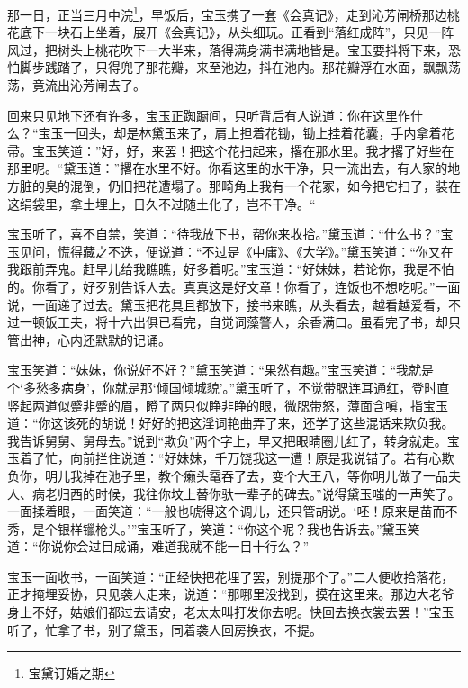 \documentclass[12pt,oneside]{book}
\begin{document}
那一日，正当三月中浣\footnote{宝黛订婚之期}，早饭后，宝玉携了一套《会真记》，走到沁芳闸桥那边桃花底下一块石上坐着，展开《会真记》，从头细玩。正看到“落红成阵”，只见一阵风过，把树头上桃花吹下一大半来，落得满身满书满地皆是。宝玉要抖将下来，恐怕脚步践踏了，只得兜了那花瓣，来至池边，抖在池内。那花瓣浮在水面，飘飘荡荡，竟流出沁芳闸去了。

回来只见地下还有许多，宝玉正踟蹰间，只听背后有人说道：你在这里作什么？“宝玉一回头，却是林黛玉来了，肩上担着花锄，锄上挂着花囊，手内拿着花帚。宝玉笑道：”好，好，来罢！把这个花扫起来，撂在那水里。我才撂了好些在那里呢。“黛玉道：”撂在水里不好。你看这里的水干净，只一流出去，有人家的地方脏的臭的混倒，仍旧把花遭塌了。那畸角上我有一个花冢，如今把它扫了，装在这绢袋里，拿土埋上，日久不过随土化了，岂不干净。“

宝玉听了，喜不自禁，笑道：“待我放下书，帮你来收拾。”黛玉道：“什么书？”宝玉见问，慌得藏之不迭，便说道：“不过是《中庸》、《大学》。”黛玉笑道：“你又在我跟前弄鬼。赶早儿给我瞧瞧，好多着呢。”宝玉道：“好妹妹，若论你，我是不怕的。你看了，好歹别告诉人去。真真这是好文章！你看了，连饭也不想吃呢。”一面说，一面递了过去。黛玉把花具且都放下，接书来瞧，从头看去，越看越爱看，不过一顿饭工夫，将十六出俱已看完，自觉词藻警人，余香满口。虽看完了书，却只管出神，心内还默默的记诵。

宝玉笑道：“妹妹，你说好不好？”黛玉笑道：“果然有趣。”宝玉笑道：“我就是个‘多愁多病身’，你就是那‘倾国倾城貌’。”黛玉听了，不觉带腮连耳通红，登时直竖起两道似蹙非蹙的眉，瞪了两只似睁非睁的眼，微腮带怒，薄面含嗔，指宝玉道：“你这该死的胡说！好好的把这淫词艳曲弄了来，还学了这些混话来欺负我。我告诉舅舅、舅母去。”说到“欺负”两个字上，早又把眼睛圈儿红了，转身就走。宝玉着了忙，向前拦住说道：“好妹妹，千万饶我这一遭！原是我说错了。若有心欺负你，明儿我掉在池子里，教个癞头鼋吞了去，变个大王八，等你明儿做了一品夫人、病老归西的时候，我往你坟上替你驮一辈子的碑去。”说得黛玉嗤的一声笑了。一面揉着眼，一面笑道：“一般也唬得这个调儿，还只管胡说。‘呸！原来是苗而不秀，是个银样镴枪头。’”宝玉听了，笑道：“你这个呢？我也告诉去。”黛玉笑道：“你说你会过目成诵，难道我就不能一目十行么？”

宝玉一面收书，一面笑道：“正经快把花埋了罢，别提那个了。”二人便收拾落花，正才掩埋妥协，只见袭人走来，说道：“那哪里没找到，摸在这里来。那边大老爷身上不好，姑娘们都过去请安，老太太叫打发你去呢。快回去换衣裳去罢！”宝玉听了，忙拿了书，别了黛玉，同着袭人回房换衣，不提。
\end{document}
